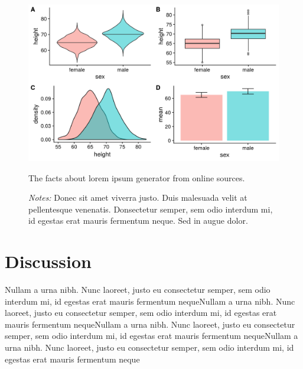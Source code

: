 \documentclass[12pt]{article}
\begin{document}
\hspace{1em}

\begin{figure}[H]
    \centering
    \includegraphics[width=1\linewidth]{figures/figure.png}
    \caption{The facts about lorem ipsum generator from online sources.}
    \label{fig:enter-label}
    \caption*{\footnotesize \textit{Notes:} Donec sit amet viverra justo. Duis malesuada velit at pellentesque venenatis. Donsectetur semper, sem odio interdum mi, id egestas erat mauris fermentum neque. Sed in augue dolor.}
\end{figure}

\section{Discussion}
Nullam a urna nibh. Nunc laoreet, justo eu consectetur semper, sem odio interdum mi, id egestas erat mauris fermentum nequeNullam a urna nibh. Nunc laoreet, justo eu consectetur semper, sem odio interdum mi, id egestas erat mauris fermentum nequeNullam a urna nibh. Nunc laoreet, justo eu consectetur semper, sem odio interdum mi, id egestas erat mauris fermentum nequeNullam a urna nibh. Nunc laoreet, justo eu consectetur semper, sem odio interdum mi, id egestas erat mauris fermentum neque

\textcite{peasgood_developing_2022, peasgood_should_2022}

\parencite{peasgood_randomised_2023, peasgood_systematic_2024, the_nhs_covid-19_2023}

\parencite{shih_health_2022, james_patient_2022, harrison_estimating_2023}


\clearpage
\newrefcontext[sorting=nyt]
\printbibliography
\end{document}

